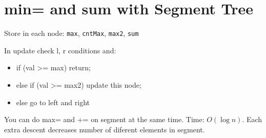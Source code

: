\section*{min= and sum with Segment Tree}

Store in each node: \texttt{max}, \texttt{cntMax}, \texttt{max2}, \texttt{sum}

In update check l, r conditions and: 
\begin{itemize}
\item if (val >= max) return;
\item else if (val >= max2) update this node;
\item else go to left and right
\end{itemize}

You can do max= and += on segment at the same time.
Time: $O(\log n)$. Each extra descent decreases number of diferent elements in segment. 

